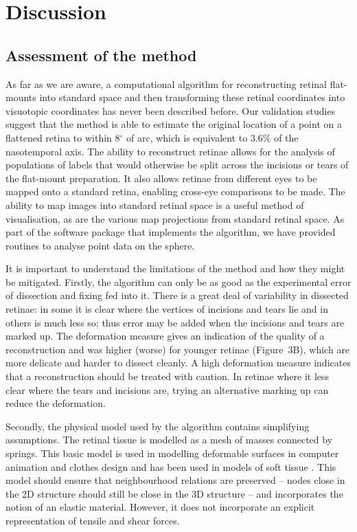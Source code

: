 \documentclass[10pt]{article}
\newcounter{Figure}
\begin{document}
\section*{Discussion}
\subsection*{Assessment of the method}
As far as we are aware, a computational algorithm for reconstructing
retinal flat-mounts into standard space and then transforming these
retinal coordinates into visuotopic coordinates has never been
described before. Our validation studies suggest that the method is
able to estimate the original location of a point on a flattened
retina to within 8$^{\circ}$ of arc, which is equivalent to 3.6\% of the
nasotemporal axis.  The ability to reconstruct retinae allows for the
analysis of populations of labels that would otherwise be split
across the incisions or tears of the flat-mount preparation. It also
allows retinae from different eyes to be mapped onto a standard
retina, enabling cross-eye comparisons to be made. The ability to map
images into standard retinal space is a useful method of
visualisation, as are the various map projections from standard
retinal space. As part of the software package that implements the
algorithm, we have provided routines to analyse point data on the
sphere. 

It is important to understand the limitations of the method and how
they might be mitigated. Firstly, the algorithm can only be as good
as the experimental error of dissection and fixing fed into it. 
There is a great deal of variability in dissected retinae: in some it
is clear where the vertices of incisions and tears lie and in others
is much less so; thus error may be added when the incisions and tears
are marked up. The deformation measure gives an indication of the
quality of a reconstruction and was higher (worse) for younger
retinae (Figure~3B), which are more delicate and harder to dissect
cleanly.  A high deformation measure indicates that a reconstruction
should be treated with caution. In retinae where it less clear where
the tears and incisions are, trying an alternative marking up can
reduce the deformation.

Secondly, the physical model used by the algorithm contains
simplifying assumptions. The retinal tissue is modelled as a mesh of
masses connected by springs. This basic model is used in modelling
deformable surfaces in computer animation and clothes design \cite{FanEtal1998,McCartneyEtal1999,WangEtal2002} and has been used
in models of soft tissue \cite{SkrinjarDuncan1999}. This model
should ensure that neighbourhood relations are preserved -- nodes
close in the 2D structure should still be close in the 3D structure
-- and incorporates the notion of an elastic material. However, it
does not incorporate an explicit representation of tensile and shear
forces. 
\end{document}
